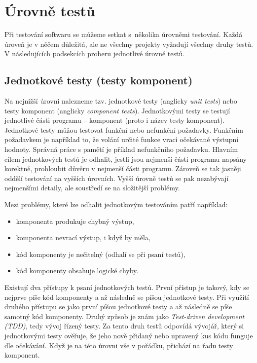\section{Úrovně testů}
\label{section:urovne_testu}
Při testování softwaru se můžeme setkat s~několika úrovněmi testování. Každá úroveň je v něčem důležitá, ale ne všechny projekty vyžadují všechny druhy testů. V následujících podsekcích proberu jednotlivé úrovně testů.

\subsection{Jednotkové testy (testy komponent)}
\label{section:jednotkove_testy}
Na nejnižší úrovni nalezneme tzv. jednotkové testy (anglicky \textit{unit tests}) nebo testy komponent (anglicky \textit{component tests}). Jednotkovými testy se testují jednotlivé části programu -- komponent (proto i název testy komponent). Jednotkové testy můžou testovat funkční nebo nefunkční požadavky. Funkčním požadavkem je například to, že volání určité funkce vrací očekávané výstupní hodnoty. Správná práce s pamětí je příklad nefunkčního požadavku.
Hlavním cílem jednotkových testů je odhalit, jestli jsou nejmenší části programu napsány korektně, prohloubit důvěru v nejmenší části programu. Zároveň se tak jasněji oddělí testování na vyšších úrovních. Vyšší úrovně testů se pak nezabývají nejmenšími detaily, ale soustředí se na složitější problémy.

Mezi problémy, které lze odhalit jednotkovým testováním patří například:
\begin{itemize}
    \item komponenta produkuje chybný výstup,
    \item komponenta nevrací výstup, i když by měla,
    \item kód komponenty je nečitelný (odhalí se při psaní testů),
    \item kód komponenty obsahuje logické chyby.
\end{itemize}

Existují dva přístupy k psaní jednotkových testů. První přístup je takový, kdy se nejprve píše kód komponenty a až následně se píšou jednotkové testy. Při využití druhého přístupu se jako první píšou jednotkové testy a až následně se píše samotný kód komponenty. Druhý způsob je znám jako \textit{Test-driven development (TDD)}, tedy vývoj řízený testy.
Za tento druh testů odpovídá vývojář, který si jednotkovými testy ověřuje, že jeho nově přidaný nebo upravený kus kódu funguje dle očekávání.
Když je na této úrovni vše v pořádku, přichází na řadu testy komponent.

